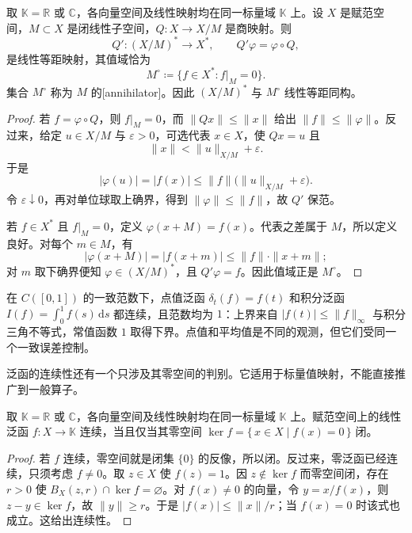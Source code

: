 \begin{proposition}[商空间的对偶]\label{b1:prop:quotient-dual}
取 \(\mathbb K=\mathbb R\) 或 \(\mathbb C\)，各向量空间及线性映射均在同一标量域 \(\mathbb K\) 上。设 \(X\) 是赋范空间，\(M\subset X\) 是闭线性子空间，\(Q:X\to X/M\) 是商映射。则
\[
Q':(X/M)^*\longrightarrow X^*,\qquad Q'\varphi=\varphi\circ Q,
\]
是线性等距映射，其值域恰为
\[
M^\circ\coloneqq\{f\in X^*:f|_M=0\}.
\]
集合 \(M^\circ\) 称为 \(M\) 的[annihilator]。因此 \((X/M)^*\) 与 \(M^\circ\) 线性等距同构。
\end{proposition}
\begin{proof}
若 \(f=\varphi\circ Q\)，则 \(f|_M=0\)，而 \(\|Qx\|\leq\|x\|\) 给出 \(\|f\|\leq\|\varphi\|\)。反过来，给定 \(u\in X/M\) 与 \(\varepsilon>0\)，可选代表 \(x\in X\)，使 \(Qx=u\) 且
\[
\|x\|<\|u\|_{X/M}+\varepsilon.
\]
于是
\[
|\varphi(u)|=|f(x)|
\leq\|f\|\bigl(\|u\|_{X/M}+\varepsilon\bigr).
\]
令 \(\varepsilon\downarrow0\)，再对单位球取上确界，得到 \(\|\varphi\|\leq\|f\|\)，故 \(Q'\) 保范。

若 \(f\in X^*\) 且 \(f|_M=0\)，定义 \(\varphi(x+M)=f(x)\)。代表之差属于 \(M\)，所以定义良好。对每个 \(m\in M\)，有
\[
|\varphi(x+M)|=|f(x+m)|\leq\|f\|\cdot\|x+m\|;
\]
对 \(m\) 取下确界便知 \(\varphi\in(X/M)^*\)，且 \(Q'\varphi=f\)。因此值域正是 \(M^\circ\)。
\end{proof}

在 \(C([0,1])\) 的一致范数下，点值泛函 \(\delta_t(f)=f(t)\) 和积分泛函 \(I(f)=\int_0^1f(s)\,\mathrm ds\) 都连续，且范数均为 \(1\)：上界来自 \(|f(t)|\leq\|f\|_\infty\) 与积分三角不等式，常值函数 \(1\) 取得下界。点值和平均值是不同的观测，但它们受同一个一致误差控制。

\ProseParagraphBreak

泛函的连续性还有一个只涉及其零空间的判别。它适用于标量值映射，不能直接推广到一般算子。

\begin{proposition}\label{b1:prop:functional-closed-kernel}
取 \(\mathbb K=\mathbb R\) 或 \(\mathbb C\)，各向量空间及线性映射均在同一标量域 \(\mathbb K\) 上。赋范空间上的线性泛函 \(f:X\rightarrow\mathbb K\) 连续，当且仅当其零空间 \(\ker f=\{\,x\in X\mid f(x)=0\,\}\) 闭。
\end{proposition}
\begin{proof}
若 \(f\) 连续，零空间就是闭集 \(\{0\}\) 的反像，所以闭。反过来，零泛函已经连续，只须考虑 \(f\ne0\)。取 \(z\in X\) 使 \(f(z)=1\)。因 \(z\notin\ker f\) 而零空间闭，存在 \(r>0\) 使 \(B_X(z,r)\cap\ker f=\varnothing\)。对 \(f(x)\ne0\) 的向量，令 \(y=x/f(x)\)，则 \(z-y\in\ker f\)，故 \(\|y\|\geq r\)。于是 \(|f(x)|\leq\|x\|/r\)；当 \(f(x)=0\) 时该式也成立。这给出连续性。
\end{proof}

